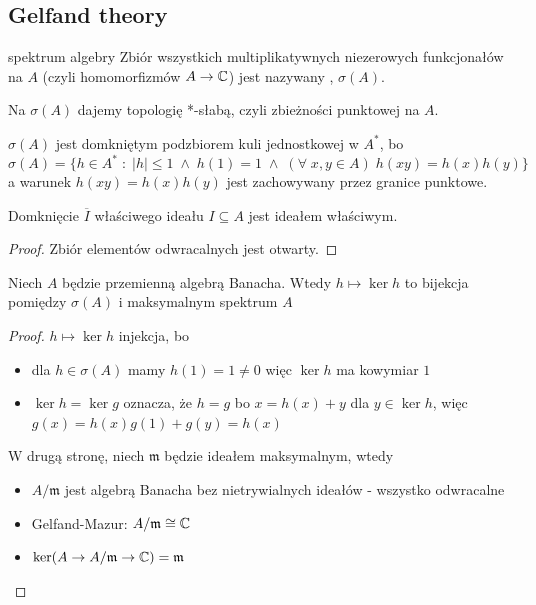 \subsection{Gelfand theory}

\begin{definition}{spektrum algebry}{}
  Zbiór wszystkich multiplikatywnych niezerowych funkcjonałów na $A$ (czyli homomorfizmów $A\to \mathbb{C}$) jest nazywany , $\sigma(A)$.
\end{definition}

Na $\sigma(A)$ dajemy topologię *-słabą, czyli zbieżności punktowej na $A$.

$\sigma(A)$ jest domkniętym podzbiorem kuli jednostkowej w $A^*$, bo
$$\sigma(A)=\{h\in A^*\;:\;|h|\leq 1\;\land\;h(1)=1\;\land\;(\forall\;x,y\in A)\;h(xy)=h(x)h(y)\}$$
a warunek $h(xy)=h(x)h(y)$ jest zachowywany przez granice punktowe.

\begin{theorem}{}{}
  Domknięcie $\overline{I}$ właściwego ideału $I\subseteq A$ jest ideałem właściwym.
\end{theorem}

\begin{proof}
  Zbiór elementów odwracalnych jest otwarty.
\end{proof}

\begin{theorem}{}{}
  Niech $A$ będzie przemienną algebrą Banacha. Wtedy $h\mapsto \ker h$ to bijekcja pomiędzy $\sigma(A)$ i maksymalnym spektrum $A$
\end{theorem}

\begin{proof}
  $h\mapsto \ker h$ injekcja, bo
  \begin{itemize}
    \item dla $h\in\sigma(A)$ mamy $h(1)=1\neq 0$ więc $\ker h$ ma kowymiar $1$
    \item $\ker h=\ker g$ oznacza, że $h=g$ bo $x=h(x)+y$ dla $y\in \ker h$, więc $g(x)=h(x)g(1)+g(y)=h(x)$
  \end{itemize}

  W drugą stronę, niech $\mathfrak{m}$ będzie ideałem maksymalnym, wtedy
  \begin{itemize}
    \item $A/\mathfrak{m}$ jest algebrą Banacha bez nietrywialnych ideałów - wszystko odwracalne
    \item Gelfand-Mazur: $A/\mathfrak{m}\cong\mathbb{C}$
    \item $\ker(A\to A/\mathfrak{m}\to \mathbb{C})=\mathfrak{m}$
  \end{itemize}
\end{proof}

